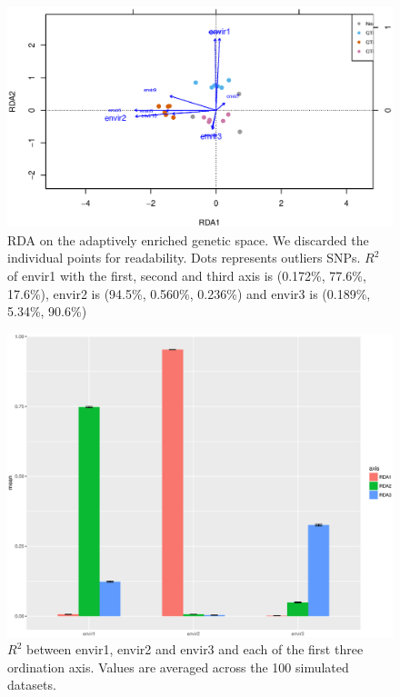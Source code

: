 \documentclass[nogrid]{MBE}%
\begin{document}
\begin{figure}[t]
\begin{center}
\includegraphics[height=0.4\textheight]{figures/rdaA.eps}
\end{center}
\caption{RDA on the adaptively enriched genetic space. We discarded the individual points for readability. Dots represents outliers SNPs.  $R^2$ of envir1 with the first, second and third axis is (0.172\%, 77.6\%, 17.6\%), envir2 is (94.5\%, 0.560\%, 0.236\%) and envir3 is (0.189\%, 5.34\%, 90.6\%)}%
\label{fig:rdaA}%
\end{figure}

\begin{figure}[t]
\begin{center}
\includegraphics[height=0.21\textheight]{figures/R2.eps}
\end{center}
\caption{$R^2$ between envir1, envir2 and envir3 and each of the first three ordination axis. Values are averaged across the 100 simulated datasets.}%
\label{fig:R2}%
\end{figure}
\end{document}
